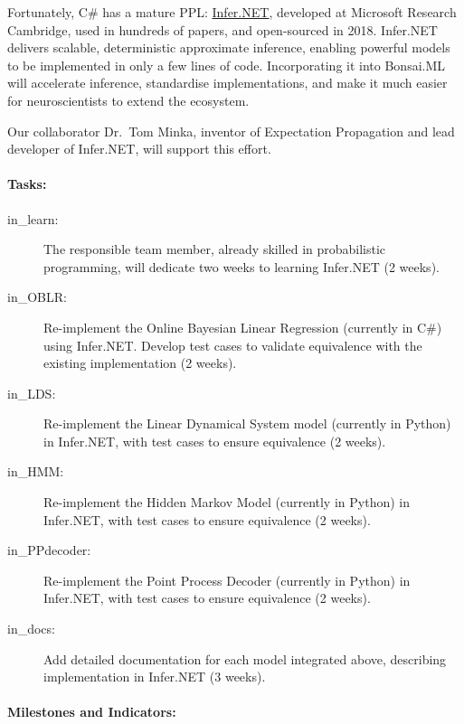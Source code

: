 Fortunately, C\# has a mature PPL:
\href{https://dotnet.github.io/infer/}{Infer.NET}, developed at Microsoft
Research Cambridge, used in hundreds of papers, and open-sourced in 2018.
Infer.NET delivers scalable, deterministic approximate inference, enabling
powerful models to be implemented in only a few lines of code. Incorporating it
into Bonsai.ML will accelerate inference, standardise implementations, and make
it much easier for neuroscientists to extend the ecosystem.  

Our collaborator Dr.~Tom Minka, inventor of Expectation Propagation and lead
developer of Infer.NET, will support this effort.  

\paragraph{Tasks:}  

\begin{description}
    \item[in\_learn:] The responsible team member, already skilled in probabilistic programming, will dedicate two weeks to learning Infer.NET (2 weeks).  

    \item[in\_OBLR:] Re-implement the Online Bayesian Linear Regression (currently in C\#) using Infer.NET. Develop test cases to validate equivalence with the existing implementation (2 weeks).  

    \item[in\_LDS:] Re-implement the Linear Dynamical System model (currently in Python) in Infer.NET, with test cases to ensure equivalence (2 weeks).  

    \item[in\_HMM:] Re-implement the Hidden Markov Model (currently in Python) in Infer.NET, with test cases to ensure equivalence (2 weeks).  

    \item[in\_PPdecoder:] Re-implement the Point Process Decoder (currently in Python) in Infer.NET, with test cases to ensure equivalence (2 weeks).  

    \item[in\_docs:] Add detailed documentation for each model integrated above, describing implementation in Infer.NET (3 weeks).  

\end{description}  

\paragraph{Milestones and Indicators:}  

